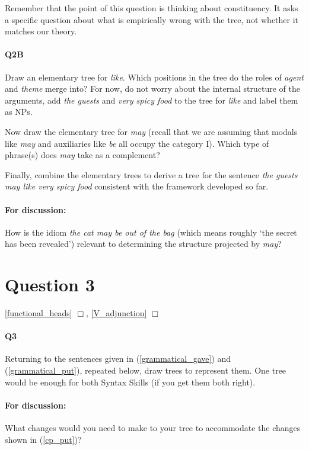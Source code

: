 \documentclass{article}
\begin{document}
Remember that the point of this question is thinking about constituency. It asks a specific question about what is empirically wrong with the tree, not whether it matches our theory.
\begin{exe}
    \label{spicy_food}
\end{exe}

\paragraph{Q2B} Draw an elementary tree for \emph{like}. Which positions in the tree do the roles of \emph{agent} and \emph{theme} merge into? For now, do not worry about the internal structure of the arguments, add \emph{the guests} and \emph{very spicy food} to the tree for \emph{like} and label them as NPs.

Now draw the elementary tree for \emph{may} (recall that we are assuming that modals like \emph{may} and auxiliaries like \emph{be} all occupy the category I).
Which type of phrase(s) does \emph{may} take as a complement?

Finally, combine the elementary trees to derive a tree for the sentence \emph{the guests may like very spicy food} consistent with the framework developed so far.

\paragraph{For discussion:} How is the idiom \emph{the cat may be out of the bag} (which means roughly `the secret has been revealed') relevant to determining the structure projected by \emph{may}? 

\section*{Question 3}
\hfill{} \ref{functional_heads} $\Box$, \ref{V_adjunction} $\Box$

\paragraph{Q3}Returning to the sentences given in (\ref{grammatical_gave}) and (\ref{grammatical_put}), repeated below, draw trees to represent them. One tree would be enough for both Syntax Skills (if you get them both right).
\begin{exe}
\end{exe}

\paragraph{For discussion:} What changes would you need to make to your tree to accommodate the changes shown in (\ref{cp_put})?
\begin{exe}
    \label{cp_put}
\end{exe}
\end{document}

